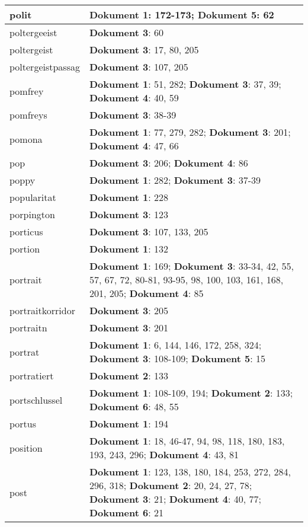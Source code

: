 \documentclass[a5paper]{article}
\begin{document}
\begin{longtable}[l]{|l|p{3in}|}
\hline
polit & \textbf{Dokument 1}: 172-173; \textbf{Dokument 5}: 62 \\
\hline
poltergeeist & \textbf{Dokument 3}: 60 \\
\hline
poltergeist & \textbf{Dokument 3}: 17, 80, 205 \\
\hline
poltergeistpassag & \textbf{Dokument 3}: 107, 205 \\
\hline
pomfrey & \textbf{Dokument 1}: 51, 282; \textbf{Dokument 3}: 37, 39; \textbf{Dokument 4}: 40, 59 \\
\hline
pomfreys & \textbf{Dokument 3}: 38-39 \\
\hline
pomona & \textbf{Dokument 1}: 77, 279, 282; \textbf{Dokument 3}: 201; \textbf{Dokument 4}: 47, 66 \\
\hline
pop & \textbf{Dokument 3}: 206; \textbf{Dokument 4}: 86 \\
\hline
poppy & \textbf{Dokument 1}: 282; \textbf{Dokument 3}: 37-39 \\
\hline
popularitat & \textbf{Dokument 1}: 228 \\
\hline
porpington & \textbf{Dokument 3}: 123 \\
\hline
porticus & \textbf{Dokument 3}: 107, 133, 205 \\
\hline
portion & \textbf{Dokument 1}: 132 \\
\hline
portrait & \textbf{Dokument 1}: 169; \textbf{Dokument 3}: 33-34, 42, 55, 57, 67, 72, 80-81, 93-95, 98, 100, 103, 161, 168, 201, 205; \textbf{Dokument 4}: 85 \\
\hline
portraitkorridor & \textbf{Dokument 3}: 205 \\
\hline
portraitn & \textbf{Dokument 3}: 201 \\
\hline
portrat & \textbf{Dokument 1}: 6, 144, 146, 172, 258, 324; \textbf{Dokument 3}: 108-109; \textbf{Dokument 5}: 15 \\
\hline
portratiert & \textbf{Dokument 2}: 133 \\
\hline
portschlussel & \textbf{Dokument 1}: 108-109, 194; \textbf{Dokument 2}: 133; \textbf{Dokument 6}: 48, 55 \\
\hline
portus & \textbf{Dokument 1}: 194 \\
\hline
position & \textbf{Dokument 1}: 18, 46-47, 94, 98, 118, 180, 183, 193, 243, 296; \textbf{Dokument 4}: 43, 81 \\
\hline
post & \textbf{Dokument 1}: 123, 138, 180, 184, 253, 272, 284, 296, 318; \textbf{Dokument 2}: 20, 24, 27, 78; \textbf{Dokument 3}: 21; \textbf{Dokument 4}: 40, 77; \textbf{Dokument 6}: 21 \\

\end{longtable}
\end{document}

